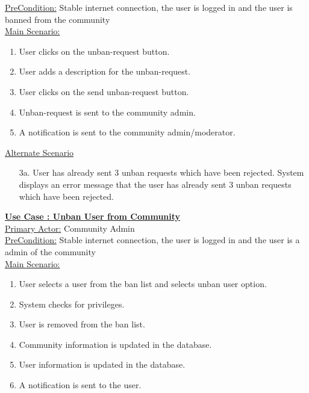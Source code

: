\documentclass[conference,compsoc]{IEEEtran}
\newcounter{UC}
\newcommand{\nextU}{\stepcounter{UC}\theUC}
\begin{document}
\underline{PreCondition:} Stable internet connection, the user is logged in and the user is banned from the community\\

\underline{Main Scenario:}\\
\begin{enumerate}
    \item User clicks on the unban-request button.
    \item User adds a description for the unban-request.
    \item User clicks on the send unban-request button.
    \item Unban-request is sent to the community admin.
    \item A notification is sent to the community admin/moderator.
\end{enumerate}

\underline{Alternate Scenario}
\begin{enumerate}
    \item [3a.] User has already sent 3 unban requests which have been rejected. System displays an error message that the user has already sent 3 unban requests which have been rejected.
\end{enumerate}\vspace{0.2cm}

\underline{\textbf{Use Case \nextU: Unban User from Community}}\\

\underline{Primary Actor:} Community Admin\\

\underline{PreCondition:} Stable internet connection, the user is logged in and the user is a admin of the community\\

\underline{Main Scenario:}\\
\begin{enumerate}
    \item User selects a user from the ban list and selects unban user option.
    \item System checks for privileges.
    \item User is removed from the ban list.
    \item Community information is updated in the database.
    \item User information is updated in the database.
    \item A notification is sent to the user.
\end{enumerate}
\end{document}
